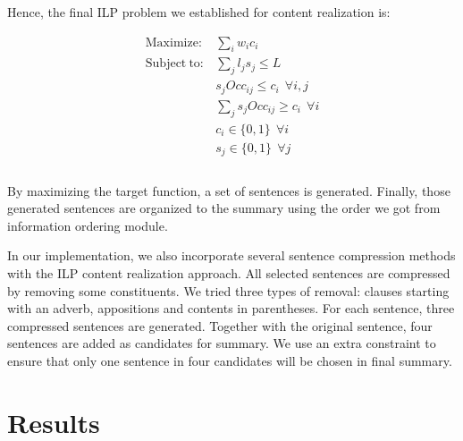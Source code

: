 \documentclass[11pt]{article}
\begin{document}
Hence, the final ILP problem we established for content realization is:

\begin{equation}
	\begin{aligned}
	\mathrm{Maximize:} & \sum_i{w_ic_i} \\
	\mathrm{Subject\ to:} & \sum_j{l_js_j} \leq L \\
 	& s_jOcc_{ij} \leq c_i\ \ \forall i,j\\
	& \sum_j s_jOcc_{ij} \geq c_i\ \ \forall i \\
	& c_i \in \{0,1\}\ \ \forall i \\
	& s_j \in \{0,1\}\ \ \forall j \\
	\end{aligned}
\end{equation}
\\
\indent
By maximizing the target function, a set of sentences is generated. Finally, those generated sentences are organized to the summary using the order we got from information ordering module.

In our implementation, we also incorporate several sentence compression methods with the ILP content realization approach. All selected sentences are compressed by removing some constituents. We tried three types of removal: clauses starting with an adverb, appositions and contents in parentheses. For each sentence, three compressed sentences are generated. Together with the original sentence, four sentences are added as candidates for summary. We use an extra constraint to ensure that only one sentence in four candidates will be chosen in final summary. 

\section{Results}
\end{document}
